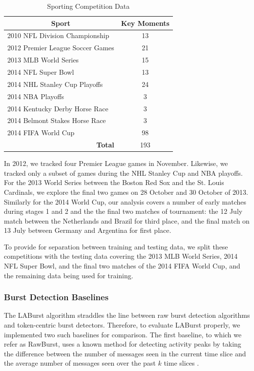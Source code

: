 \documentclass[letterpaper]{article}
\begin{document}
\begin{table}[htdp]
\footnotesize
\caption{Sporting Competition Data}
\begin{center}
\begin{tabular}{|p{2in}|c|}
\hline
\multicolumn{1}{|c|}{\textbf{Sport}} & \textbf{Key Moments} \\ \hline
2010 NFL Division Championship & 13 \\ \hline
2012 Premier League Soccer Games & 21 \\ \hline
2013 MLB World Series  & 15 \\ \hline
2014 NFL Super Bowl & 13 \\ \hline
2014 NHL Stanley Cup Playoffs & 24 \\ \hline
2014 NBA Playoffs & 3 \\ \hline
2014 Kentucky Derby Horse Race & 3 \\ \hline
2014 Belmont Stakes Horse Race & 3 \\ \hline
2014 FIFA World Cup & 98 \\ \hline
\multicolumn{1}{|r|}{\textbf{Total}} & 193 \\ \hline
\end{tabular}
\end{center}
\label{tab:eventStats}
\end{table}

In 2012, we tracked four Premier League games in November.
Likewise, we tracked only a subset of games during the NHL Stanley Cup and NBA playoffs.
For the 2013 World Series between the Boston Red Sox and the St. Louis Cardinals, we explore the final two games on 28 October and 30 October of 2013.
Similarly for the 2014 World Cup, our analysis covers a number of early matches during stages 1 and 2 and the the final two matches of tournament: the 12 July match between the Netherlands and Brazil for third place, and the final match on 13 July between Germany and Argentina for first place.

To provide for separation between training and testing data, we split these competitions with the testing data covering the 2013 MLB World Series, 2014 NFL Super Bowl, and the final two matches of the 2014 FIFA World Cup, and the remaining data being used for training.

\subsubsection{Burst Detection Baselines}

The LABurst algorithm straddles the line between raw burst detection algorithms and token-centric burst detectors.
Therefore, to evaluate LABurst properly, we implemented two such baselines for comparison.
The first baseline, to which we refer as RawBurst, uses a known method for detecting activity peaks by taking the difference between the number of messages seen in the current time slice and the average number of messages seen over the past $k$ time slices \cite{vasudevan2013twitter,Lehmann:2012:DCC:2187836.2187871}.
\end{document}
